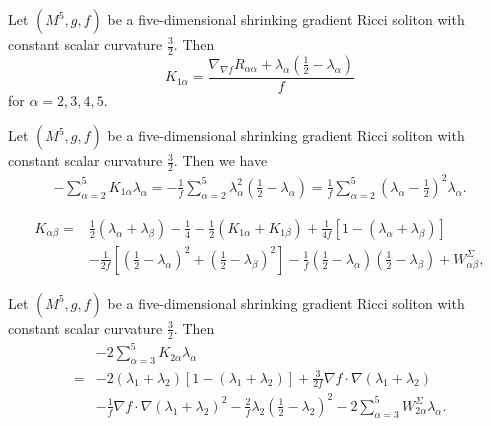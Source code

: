 \documentclass[10pt,a4paper]{amsart}
\newcommand{\ban}{\begin{eqnarray*}}
\newcommand{\ean}{\end{eqnarray*}}
\begin{document}
	\begin{lem} Let $(M^5, g, f)$ be a five-dimensional shrinking gradient Ricci soliton with constant scalar curvature $\frac{3}{2}$. Then
		\begin{equation}\label{k1a}
		K_{1\alpha}=\frac{\nabla_{\nabla f}R_{\alpha\alpha} +\lambda_\alpha(\frac{1}{2}-\lambda_\alpha)}{f}
		\end{equation}	
		for $\alpha=2,  3 ,4, 5.$	
	\end{lem}

	\begin{lem}\label{lek1a}
		Let $(M^5, g, f)$ be a five-dimensional shrinking gradient Ricci soliton with constant scalar curvature $\frac{3}{2}$. Then we have
		\ban
		 -\sum_{\alpha=2}^5K_{1\alpha}\lambda_\alpha=-\frac{1}{f}\sum_{\alpha=2}^5\lambda_\alpha^2(\frac{1}{2}-\lambda_\alpha)=\frac{1}{f}\sum_{\alpha=2}^5(\lambda_\alpha-\frac{1}{2})^2\lambda_\alpha.
		\ean
	\end{lem}

	\begin{equation}\label{kab}
	\begin{aligned}
	K_{\alpha \beta }=&{\frac{1}{2}}(\lambda_{\alpha}+\lambda_{\beta})-{\frac{1}{4}}-{\frac{1}{2}}(K_{1\alpha }+K_{1\beta })+{\frac{1}{4f}}[1-(\lambda_{\alpha }+\lambda_{\beta})] \\
	&- {\frac{1}{2f}}\left[ ({\frac{1}{2}}-\lambda_{\alpha})^2+({\frac{1}{2}}-\lambda_{\beta})^2\right]-{\frac{1}{f}}({\frac{1}{2}}-\lambda_{\alpha})({\frac{1}{2}}-\lambda_{\beta})+W^{\Sigma}_{\alpha \beta },
	\end{aligned}
	\end{equation}

	\begin{lem}\label{lek2a}
		Let $(M^5, g, f)$ be a five-dimensional shrinking gradient Ricci soliton with constant scalar curvature $\frac{3}{2}$. Then
 \begin{equation*}
	\begin{aligned}
		&-2\sum_{\alpha=3}^5K_{2\alpha}\lambda_\alpha\\
		=&-2(\lambda_1+\lambda_2)[1-(\lambda_1+\lambda_2)] +\frac{3}{2f}\nabla f\cdot \nabla (\lambda_1+\lambda_2)\\
		&-\frac{1}{f}\nabla f\cdot \nabla(\lambda_1+\lambda_2)^2
		-\frac{2}{f}\lambda_2({\frac{1}{2}}-\lambda_{2})^2-2\sum_{\alpha=3}^5 W^{\Sigma}_{2\alpha}\lambda_{\alpha}.
	\end{aligned}
\end{equation*}
\end{lem}
\end{document}
